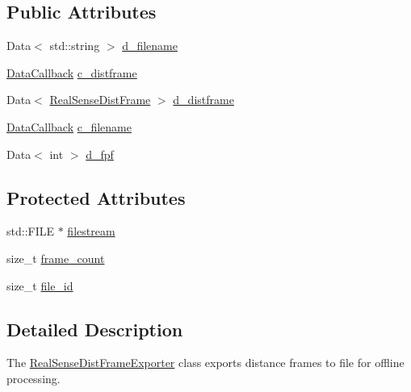 \subsection*{Public Attributes}
\begin{DoxyCompactItemize}
\item 
Data$<$ std\+::string $>$ \hyperlink{classsofa_1_1rgbdtracking_1_1_real_sense_dist_frame_exporter_aa1e3e8aa4358ca07739f2c5977d5c895}{d\+\_\+filename}
\item 
\hyperlink{namespacesofa_1_1rgbdtracking_a00834a9204a667746fef9a402ccbfb55}{Data\+Callback} \hyperlink{classsofa_1_1rgbdtracking_1_1_real_sense_dist_frame_exporter_a6a6079ff7d5fdc6aaaab98359e25aba4}{c\+\_\+distframe}
\item 
Data$<$ \hyperlink{classsofa_1_1rgbdtracking_1_1_real_sense_dist_frame}{Real\+Sense\+Dist\+Frame} $>$ \hyperlink{classsofa_1_1rgbdtracking_1_1_real_sense_dist_frame_exporter_a452a048591840521dca0604336df2503}{d\+\_\+distframe}
\item 
\hyperlink{namespacesofa_1_1rgbdtracking_a00834a9204a667746fef9a402ccbfb55}{Data\+Callback} \hyperlink{classsofa_1_1rgbdtracking_1_1_real_sense_dist_frame_exporter_a1f2771b0bf0096dc0c9266f3a1916588}{c\+\_\+filename}
\item 
Data$<$ int $>$ \hyperlink{classsofa_1_1rgbdtracking_1_1_real_sense_dist_frame_exporter_a6668d5b01ecf46b879fa0ee9c1abc43a}{d\+\_\+fpf}
\end{DoxyCompactItemize}
\subsection*{Protected Attributes}
\begin{DoxyCompactItemize}
\item 
std\+::\+F\+I\+LE $\ast$ \hyperlink{classsofa_1_1rgbdtracking_1_1_real_sense_dist_frame_exporter_a957e900e01ace4b0ef3e824300fefa5a}{filestream}
\item 
size\+\_\+t \hyperlink{classsofa_1_1rgbdtracking_1_1_real_sense_dist_frame_exporter_a0ae464397c6bf4afb7f3df3fe36d8744}{frame\+\_\+count}
\item 
size\+\_\+t \hyperlink{classsofa_1_1rgbdtracking_1_1_real_sense_dist_frame_exporter_aa3f4a42456ee7dee54a20f3a5f979bca}{file\+\_\+id}
\end{DoxyCompactItemize}


\subsection{Detailed Description}
The \hyperlink{classsofa_1_1rgbdtracking_1_1_real_sense_dist_frame_exporter}{Real\+Sense\+Dist\+Frame\+Exporter} class exports distance frames to file for offline processing. 

